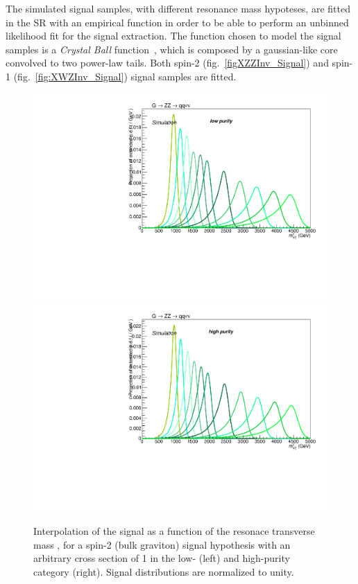 The simulated signal samples, with different resonance mass hypoteses, are fitted in the SR with an empirical function in order to be able to perform an unbinned likelihood fit for the signal extraction. The function chosen to model the signal samples is a \emph{Crystal Ball} function~\cite{Oreglia:1980cs,Skwarnicki:1986xj}, which is composed by a gaussian-like core convolved to two power-law tails. %
Both spin-2 (fig.~\ref{figXZZInv_Signal}) and spin-1 (fig.~\ref{fig:XWZInv_Signal}) signal samples are fitted.

\begin{figure}[!htb]
  \centering
    \includegraphics[width=.495\textwidth]{plotsAlpha_tesi/XVZnnlp/XZZInv_Signal.pdf}
    \includegraphics[width=.495\textwidth]{plotsAlpha_tesi/XVZnnhp/XZZInv_Signal.pdf}
  \caption{Interpolation of the signal as a function of the resonace transverse mass \mtVZ, for a spin-2 (bulk graviton) signal hypothesis with an arbitrary cross section of 1 \pb in the low- (left) and high-purity category (right). Signal distributions are normalized to unity.}
  \label{fig:XZZInv_Signal}
\end{figure}

